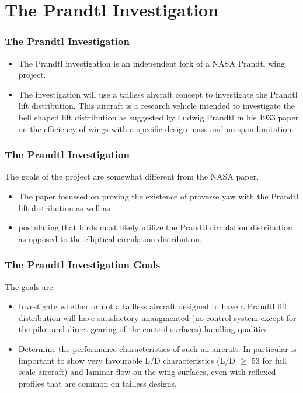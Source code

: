 \documentclass{beamer}
\begin{document}
\section{The Prandtl Investigation}

\begin{frame}
\frametitle{The Prandtl Investigation}

\begin{itemize}
\item The Prandtl investigation is an independent fork of a NASA Prandtl wing project.
\item The investigation will use a tailless aircraft concept to investigate the Prandtl lift distribution.  This aircraft is a research vehicle intended to investigate the bell shaped lift distribution as suggested by Ludwig Prandtl in his 1933 paper on the efficiency of wings with a specific design mass and no span limitation.
\end{itemize}

\end{frame}


\begin{frame}
\frametitle{The Prandtl Investigation}

The goals of the project are somewhat different from the NASA paper.  

\begin{itemize}
\item The paper focussed on proving the existence of proverse yaw with the Prandtl lift distribution as well as 
\item postulating that birds most likely utilize the Prandtl circulation distribution as opposed to the elliptical circulation distribution.  
\end{itemize}

\end{frame}



\begin{frame}
\frametitle{The Prandtl Investigation Goals}

The goals are:

\begin{itemize}
\item Investigate whether or not a tailless aircraft designed to have a Prandtl lift distribution will have satisfactory unaugmented (no control system except for the pilot and direct gearing of the control surfaces) handling qualities.
\item Determine the performance characteristics of such an aircraft.  In particular is important to show very favourable L/D characteristics (L/D $\geq$ 53 for full scale aircraft) and laminar flow on the wing surfaces, even with reflexed profiles that are common on tailless designs.
\end{itemize}

\end{frame}
\end{document}
